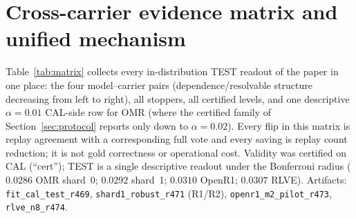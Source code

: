 \documentclass{article}
\theoremstyle{definition}
\theoremstyle{remark}
\begin{document}
\section{Cross-carrier evidence matrix and unified mechanism}
\label{app:matrix}
Table~\ref{tab:matrix} collects every in-distribution TEST readout of the
paper in one place: the four model--carrier pairs (dependence/resolvable
structure decreasing from left to right), all stoppers, all certified
levels, and one descriptive $\alpha{=}0.01$ CAL-side row for OMR (where
the certified family of Section~\ref{sec:protocol} reports only down to
$\alpha{=}0.02$). Every flip in this matrix is replay agreement with a
corresponding full vote and every saving is replay count reduction; it is not
gold correctness or operational cost. Validity was certified on CAL (``cert''); TEST is a
single descriptive readout under the Bonferroni radius
($0.0286$ OMR shard~0; $0.0292$ shard~1; $0.0310$ OpenR1; $0.0307$ RLVE).
Artifacts: \texttt{fit\_cal\_test\_r469}, \texttt{shard1\_robust\_r471}
(R1/R2), \texttt{openr1\_m2\_pilot\_r473}, \texttt{rlve\_n8\_r474}.
\end{document}
